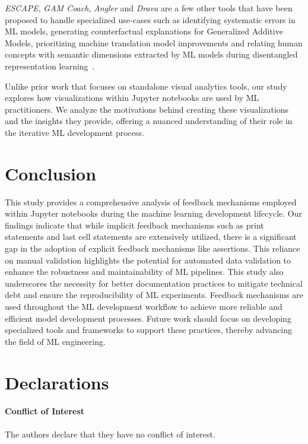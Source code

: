 \documentclass[smallextended]{svjour3}       %
\begin{document}
\textit{ESCAPE}, \textit{GAM Coach}, \textit{Angler} and \textit{Drava} are a few other tools that have been proposed to handle specialized use-cases such as identifying systematic errors in ML models, generating counterfactual explanations for Generalized Additive Models, prioritizing machine translation model improvements and relating human concepts with semantic dimensions extracted by ML models during disentangled representation learning~\citep{ahn2023escape,wang2023gam,robertson2023angler,wang2023drava}.

Unlike prior work that focuses on standalone visual analytics tools, our study explores how visualizations within Jupyter notebooks are used by ML practitioners. We analyze the motivations behind creating these visualizations and the insights they provide, offering a nuanced understanding of their role in the iterative ML development process.

\section{Conclusion}

This study provides a comprehensive analysis of feedback mechanisms employed within Jupyter notebooks during the machine learning development lifecycle. Our findings indicate that while implicit feedback mechanisms such as print statements and last cell statements are extensively utilized, there is a significant gap in the adoption of explicit feedback mechanisms like assertions. This reliance on manual validation highlights the potential for automated data validation to enhance the robustness and maintainability of ML pipelines. This study also underscores the necessity for better documentation practices to mitigate technical debt and ensure the reproducibility of ML experiments. Feedback mechanisms are used throughout the ML development workflow to achieve more reliable and efficient model development processes. Future work should focus on developing specialized tools and frameworks to support these practices, thereby advancing the field of ML engineering.

\section{Declarations}

\paragraph{\textbf{Conflict of Interest}} The authors declare that they have no conflict of interest.
\end{document}
